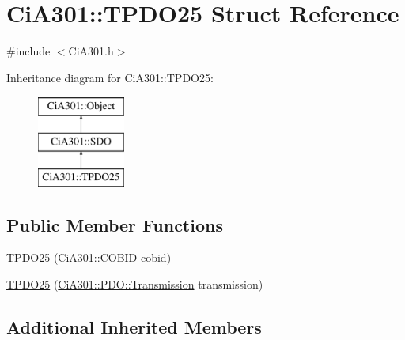 \hypertarget{struct_ci_a301_1_1_t_p_d_o25}{\section{Ci\-A301\-:\-:T\-P\-D\-O25 Struct Reference}
\label{struct_ci_a301_1_1_t_p_d_o25}
}


{\ttfamily \#include $<$Ci\-A301.\-h$>$}

Inheritance diagram for Ci\-A301\-:\-:T\-P\-D\-O25\-:\begin{figure}[H]
\begin{center}
\leavevmode
\includegraphics[height=3.000000cm]{d1/d67/struct_ci_a301_1_1_t_p_d_o25}
\end{center}
\end{figure}
\subsection*{Public Member Functions}
\begin{DoxyCompactItemize}
\item 
\hyperlink{struct_ci_a301_1_1_t_p_d_o25_a0a979d887b9c7f0ac676d7dbb77728a2}{T\-P\-D\-O25} (\hyperlink{namespace_ci_a301_aec5b5dbb2b60d2837c60499f6f297aa7}{Ci\-A301\-::\-C\-O\-B\-I\-D} cobid)
\item 
\hyperlink{struct_ci_a301_1_1_t_p_d_o25_a225b6f62814a2b33894a684320026431}{T\-P\-D\-O25} (\hyperlink{namespace_ci_a301_1_1_p_d_o_a6c7a5941fe4f869dd1703fb7ce7f6549}{Ci\-A301\-::\-P\-D\-O\-::\-Transmission} transmission)
\end{DoxyCompactItemize}
\subsection*{Additional Inherited Members}


